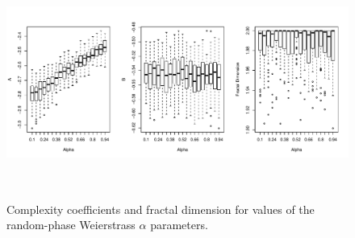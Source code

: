\begin{figure}[!htbp]
  \begin{center}
  \includegraphics[height = 3in, width =6in, keepaspectratio]{./figs/holder_coeffs-boxplots.pdf}
   
  \caption{Complexity coefficients and fractal dimension 
   for values of the random-phase
    Weierstrass $\alpha$ parameters.  }
    \label{fig:rp-weierstrass-boxplot}
  \end{center}
\end{figure}


